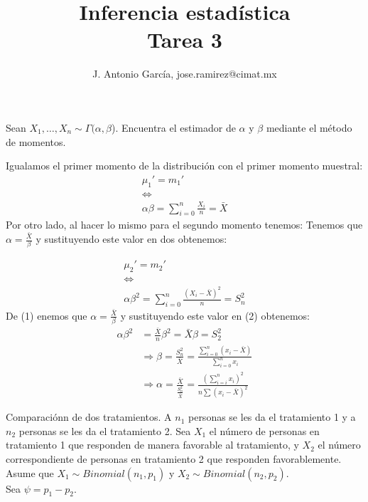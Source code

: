 \documentclass[letter]{memoir} %
\newenvironment{cframed}[1][blue]
  {\begin{tcolorbox}[colframe=#1,colback=white]}
  {\end{tcolorbox}}
\begin{document}
\title{Inferencia estadística \\
\large{Tarea 3  }}
\author{ J. Antonio García, jose.ramirez@cimat.mx}

\maketitle
\begin{enumerate}
\begin{cframed}[violet]
\item 
Sean $X_1,\dots, X_n \sim \Gamma( \alpha, \beta$). Encuentra el estimador de  $\alpha$ y $\beta$ mediante el
método de momentos. 
\end{cframed}

Igualamos el primer momento de la distribución con el primer momento muestral:
\begin{equation}
\begin{split}
\mu_1'  = m_1' \\
 \Leftrightarrow  \\
\alpha \beta =  \sum_{i=0}^n\frac{X_i}{n} = \bar{X}
\end{split}
\end{equation}
Por otro lado, al hacer lo mismo para el segundo momento tenemos:
Tenemos que $\alpha = \frac{\bar{X}}{\beta}$ y sustituyendo este valor en dos obtenemos:


\begin{equation}
\begin{split}
\mu_2'  = m_2'\\ 
 \Leftrightarrow  \\
\alpha \beta^2 =  \sum_{i=0}^n\frac{(X_i- \bar{X})^2}{n} = S_n^2
\end{split}
\end{equation}
De (1) enemos que $\alpha = \frac{\bar{X}}{\beta}$ y sustituyendo este valor en (2) obtenemos:
\[
\begin{split}
\alpha \beta ^2 & =  \frac{\bar{X}}{n}\beta^2 = \bar{X}\beta = S_2^2\\
				& \Rightarrow \beta = \frac{S_n^2}{\bar{X}} = \frac{\sum_{i=0}^n(x_i -\bar{X})}{\sum_{i=0}^nx_i} \\
                & \Rightarrow \alpha = \frac{\bar{X}}{\frac{S_n^2}{\bar{X}}} = \frac{(\sum_{i=i}^nx_i)^2}{n\sum(x_i - \bar{X})^2}
\end{split}
\]

\begin{cframed}[teal]
\item Comparaciónn de dos tratamientos. A $n_1$ personas se les da el tratamiento 1 y a $n_2$ personas se les da el tratamiento 2. Sea $X_1$ el número de personas en tratamiento 1 que responden de manera favorable al tratamiento, y $X_2$ el número correspondiente de personas en tratamiento 2 que responden favorablemente. Asume que $X_1 \sim Binomial(n_1, p_1)$ y $X_2 \sim  Binomial(n_2 ,p_2)$.\\ Sea  $\psi = p_1 - p_2$.
\end{cframed}


\end{enumerate}
\end{document}
